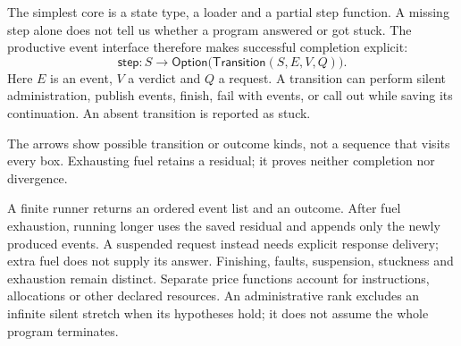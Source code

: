 \documentclass[11pt,a4paper]{article}
\newcommand{\diagramcaption}[1]{\par{\small\color{ink}#1\par}\medskip}
\begin{document}
The simplest core is a state type, a loader and a partial step function.
A missing step alone does not tell us whether a program answered or got stuck.
The productive event interface therefore makes successful completion explicit:
\[
 \mathsf{step}:S\longrightarrow
 \mathsf{Option}\bigl(\mathsf{Transition}(S,E,V,Q)\bigr).
\]
Here $E$ is an event, $V$ a verdict and $Q$ a request. A transition can perform
silent administration, publish events, finish, fail with events, or call out
while saving its continuation. An absent transition is reported as stuck.

\begin{center}
\end{center}
\diagramcaption{The arrows show possible transition or outcome kinds, not a sequence
that visits every box. Exhausting fuel retains a residual; it proves neither
completion nor divergence.}

A finite runner returns an ordered event list and an outcome. After fuel
exhaustion, running longer uses the saved residual and appends only the newly
produced events. A suspended request instead needs explicit response delivery;
extra fuel does not supply its answer. Finishing,
faults, suspension, stuckness and exhaustion remain distinct. Separate price
functions account for instructions, allocations or other declared resources.
An administrative rank excludes an infinite silent stretch when its hypotheses
hold; it does not assume the whole program terminates.
\end{document}
